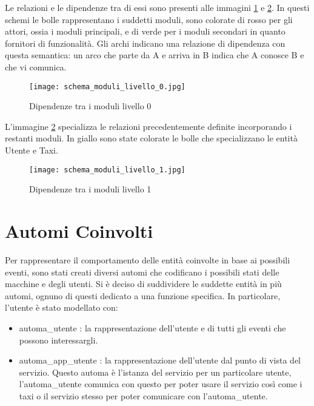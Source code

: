 Le relazioni e le dipendenze tra di essi sono presenti alle immagini \ref{fig:schema_moduli_livello_0} e \ref{fig:schema_moduli_livello_1}.
In questi schemi le bolle rappresentano i suddetti moduli, sono colorate di rosso per gli attori, ossia i moduli principali, e di verde per i moduli secondari in quanto fornitori di funzionalità. Gli archi indicano una relazione di dipendenza con questa semantica: un arco che parte da A e arriva in B indica che A conosce B e che vi comunica.
\begin{figure}[htbp]
	\centering
	\texttt{[image: schema\_moduli\_livello\_0.jpg]}
	\caption{Dipendenze tra i moduli livello 0}
	\label{fig:schema_moduli_livello_0}
\end{figure}

L'immagine \ref{fig:schema_moduli_livello_1} specializza le relazioni precedentemente definite incorporando i restanti moduli. In giallo sono state colorate le bolle che specializzano le entità Utente e Taxi.

\begin{figure}[htbp]
	\centering
	\texttt{[image: schema\_moduli\_livello\_1.jpg]}
	\caption{Dipendenze tra i moduli livello 1}
	\label{fig:schema_moduli_livello_1}
\end{figure}

\section{Automi Coinvolti} \label{automi}

Per rappresentare il comportamento delle entità coinvolte in base ai possibili eventi, sono stati creati diversi automi che codificano i possibili stati delle macchine e degli utenti. 
Si è deciso di suddividere le suddette entità in più automi, ognuno di questi dedicato a una funzione specifica. 
In particolare, l'utente è stato modellato con:
\begin{itemize} 
 \item automa\_utente : la rappresentazione dell'utente e di tutti gli eventi che possono interessargli.
 \item automa\_app\_utente : la rappresentazione dell'utente dal punto di vista del servizio. Questo automa è l'istanza del servizio per un particolare utente, l'automa\_utente comunica con questo per poter usare il servizio così come i taxi o il servizio stesso per poter comunicare con l'automa\_utente.
\end{itemize}

